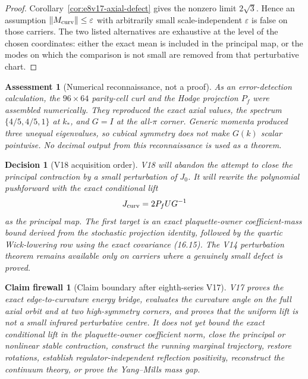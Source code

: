 \documentclass[11pt,oneside]{book}
\newtheorem{assessment}[theorem]{Assessment}
\newtheorem{firewall}[theorem]{Claim firewall}
\newtheorem{decision}[theorem]{Decision}
\theoremstyle{definition}
\theoremstyle{remark}
\begin{document}
\begin{proof}
Corollary~\ref{cor:e8v17-axial-defect} gives the nonzero limit
\(2\sqrt3\).  Hence an assumption
\(\|M_{\rm curv}\|\leq\varepsilon\) with arbitrarily small
scale-independent \(\varepsilon\) is false on those carriers.  The two
listed alternatives are exhaustive at the level of the chosen
coordinates: either the exact mean is included in the principal map,
or the modes on which the comparison is not small are removed from
that perturbative chart.
\end{proof}

\begin{assessment}[Numerical reconnaissance, not a proof]
\label{ass:e8v17-recon}
As an error-detection calculation, the \(96\times64\) parity-cell
curl and the Hodge projection \(P_f\) were assembled numerically.
They reproduced the exact axial values, the spectrum
\(\{4/5,4/5,1\}\) at \(k_*\), and \(G=I\) at the all-\(\pi\) corner.
Generic momenta produced three unequal eigenvalues, so cubical
symmetry does not make \(G(k)\) scalar pointwise.  No decimal output
from this reconnaissance is used as a theorem.
\end{assessment}

\begin{decision}[V18 acquisition order]
\label{dec:e8v17-v18}
V18 will abandon the attempt to close the principal contraction by a
small perturbation of \(J_0\).  It will rewrite the polynomial
pushforward with the exact conditional lift
\[
                       J_{\rm curv}=2P_fUG^{-1}
\]
as the principal map.  The first target is an exact
plaquette-owner coefficient-mass bound derived from the stochastic
projection identity, followed by the quartic Wick-lowering row using
the exact covariance (16.15).  The V14 perturbation theorem remains
available only on carriers where a genuinely small defect is proved.
\end{decision}

\begin{firewall}[Claim boundary after eighth-series V17]
\label{fire:e8v17-claim}
V17 proves the exact edge-to-curvature energy bridge, evaluates the
curvature angle on the full axial orbit and at two high-symmetry
corners, and proves that the uniform lift is not a small infrared
perturbative centre.  It does not yet bound the exact conditional
lift in the plaquette-owner coefficient norm, close the principal or
nonlinear stable contraction, construct the running marginal
trajectory, restore rotations, establish regulator-independent
reflection positivity, reconstruct the continuum theory, or prove
the Yang--Mills mass gap.
\end{firewall}
\end{document}
